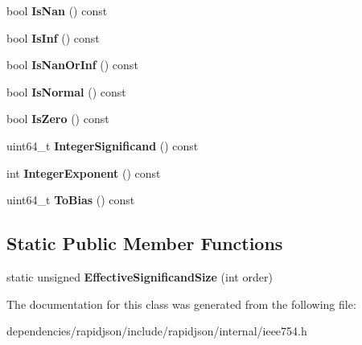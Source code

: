 \begin{DoxyCompactItemize}
bool {\bfseries Is\+Nan} () const
\item 
\mbox{\label{classinternal_1_1_double_afe1ce48f7fb9797e1a2044c58a6b226c}} 
bool {\bfseries Is\+Inf} () const
\item 
\mbox{\label{classinternal_1_1_double_a8b9a82e8b99783b7e98b5307756021c0}} 
bool {\bfseries Is\+Nan\+Or\+Inf} () const
\item 
\mbox{\label{classinternal_1_1_double_a8a39cd42010c69681da35d87f1331381}} 
bool {\bfseries Is\+Normal} () const
\item 
\mbox{\label{classinternal_1_1_double_a90a3a1ca614b377b59576955ce987ce2}} 
bool {\bfseries Is\+Zero} () const
\item 
\mbox{\label{classinternal_1_1_double_a1bf89d77be843f69facec9f2bc4dbc72}} 
uint64\+\_\+t {\bfseries Integer\+Significand} () const
\item 
\mbox{\label{classinternal_1_1_double_a9721e0fdedef4d0fe6c7b411492a88fb}} 
int {\bfseries Integer\+Exponent} () const
\item 
\mbox{\label{classinternal_1_1_double_ab3d3a81274e4f4b9b415db7c664d3ac9}} 
uint64\+\_\+t {\bfseries To\+Bias} () const
\end{DoxyCompactItemize}
\subsection*{Static Public Member Functions}
\begin{DoxyCompactItemize}
\item 
\mbox{\label{classinternal_1_1_double_a980c26d006068b23406805e9b0e02588}} 
static unsigned {\bfseries Effective\+Significand\+Size} (int order)
\end{DoxyCompactItemize}


The documentation for this class was generated from the following file\+:\begin{DoxyCompactItemize}
\item 
dependencies/rapidjson/include/rapidjson/internal/ieee754.\+h\end{DoxyCompactItemize}

